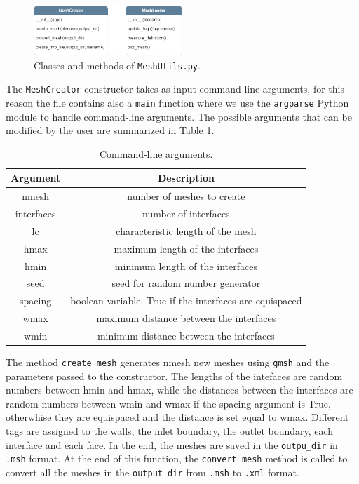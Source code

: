 \documentclass[11pt,a4paper]{article}
\begin{document}
\begin{figure}[H]
    \centering
    \includegraphics[width=0.5\textwidth]{Images/mesh_class.png}
    \caption{Classes and methods of \texttt{MeshUtils.py}.}
    \label{mesh_class}
\end{figure}

The \texttt{MeshCreator} constructor takes as input command-line arguments, for this reason the file contains also a \texttt{main} function where we use the \texttt{argparse} Python module to handle command-line arguments. 
The possible arguments that can be modified by the user are summarized in Table \ref{args}.

\begin{table}[H]
    \centering
    \begin{tabular}{|c|c|}
        \hline
        \textbf{Argument} & \textbf{Description} \\
        \hline
        nmesh & number of meshes to create \\
        interfaces & number of interfaces \\
        lc & characteristic length of the mesh \\
        hmax & maximum length of the interfaces \\
        hmin & minimum length of the interfaces \\
        seed & seed for random number generator \\
        spacing & boolean variable, True if the interfaces are equispaced \\
        wmax & maximum distance between the interfaces \\
        wmin & minimum distance between the interfaces \\
        \hline   
    \end{tabular}
    \caption{Command-line arguments.}
    \label{args}
\end{table}

The method \texttt{create\_mesh} generates nmesh new meshes using \texttt{gmsh} and the parameters passed to the constructor. The lengths of the intefaces are random numbers between hmin and hmax, while the distances between the interfaces are random numbers between wmin and wmax if the spacing argument is True, otherwhise they are equispaced and the distance is set equal to wmax. Different tags are assigned to the walls, the inlet boundary, the outlet boundary, each interface and each face. In the end, the meshes are saved in the \texttt{outpu\_dir} in \texttt{.msh} format.
At the end of this function, the \texttt{convert\_mesh} method is called to convert all the meshes in the \texttt{output\_dir} from \texttt{.msh} to \texttt{.xml} format. 
\end{document}
